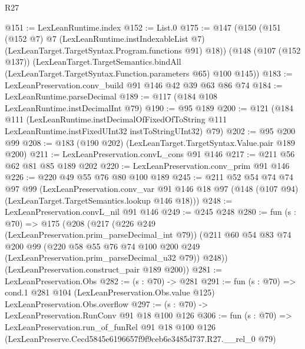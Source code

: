 \begin{lexlean}{R27}
\begin{coremodule}
@151 := LexLeanRuntime.index
@152 := List.{0}
@175 := @147
    (@150
      (@151
        (@152 @7)
        @7
        (LexLeanRuntime.instIndexableList @7)
        (LexLeanTarget.TargetSyntax.Program.functions @91)
        @18))
    (@148
      (@107 (@152 @137))
      (LexLeanTarget.TargetSemantics.bindAll
        (LexLeanTarget.TargetSyntax.Function.parameters @65)
        @100
        @145))
@183 := LexLeanPreservation.conv_build @91 @146 @42 @39 @63 @86 @74
@184 := LexLeanRuntime.parseDecimal
@189 := @117 (@184 @108 LexLeanRuntime.instDecimalInt @79)
@190 := @95 @189
@200 := @121
    (@184
      @111
      (LexLeanRuntime.instDecimalOfFixedOfToString
        @111
        LexLeanRuntime.instFixedUInt32
        instToStringUInt32)
      @79)
@202 := @95 @200 @99
@208 := @183 (@190 @202) (LexLeanTarget.TargetSyntax.Value.pair @189 @200)
@211 := LexLeanPreservation.convL_cons @91 @146
@217 := @211 @56 @62 @81 @85 @189 @202
@220 := LexLeanPreservation.conv_prim @91 @146
@226 := @220 @49 @55 @76 @80 @100 @189
@245 := @211
    @52
    @54
    @74
    @74
    @97
    @99
    (LexLeanPreservation.conv_var
      @91
      @146
      @18
      @97
      (@148 (@107 @94) (LexLeanTarget.TargetSemantics.lookup @146 @18)))
@248 := LexLeanPreservation.convL_nil @91 @146
@249 := @245 @248
@280 := fun (s : @70) =>
  @175
    (@208
      (@217
        (@226 @249 (LexLeanPreservation.prim_parseDecimal_int @79))
        (@211
          @60
          @54
          @83
          @74
          @200
          @99
          (@220 @58 @55 @76 @74 @100 @200 @249 (LexLeanPreservation.prim_parseDecimal_u32 @79))
          @248))
      (LexLeanPreservation.construct_pair @189 @200))
@281 := LexLeanPreservation.Obs
@282 := (s : @70) -> @281
@291 := fun (s : @70) =>
  cond.{1} @281 @104 (LexLeanPreservation.Obs.value @125) LexLeanPreservation.Obs.overflow
@297 := (s : @70) -> LexLeanPreservation.RunConv @91 @18 @100 @126
@306 := fun (s : @70) =>
  LexLeanPreservation.run_of_funRel
    @91
    @18
    @100
    @126
    (LexLeanPreserve.Cecd5845e6196657f9f9ceb6e3485d737.R27.__rel_0 @79)
\end{coremodule}
\end{lexlean}
